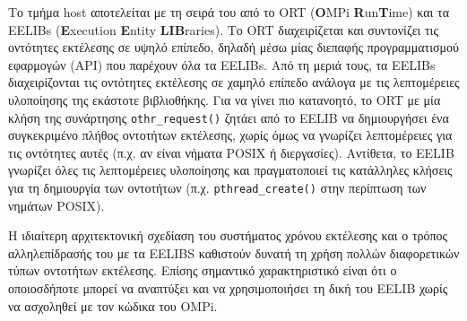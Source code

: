 Το τμήμα host αποτελείται με τη σειρά του από το ORT (\textbf{O}MPi \textbf{R}un\textbf{T}ime) και τα EELIBs (\textbf{E}xecution \textbf{E}ntity \textbf{LIB}raries). Το ORT διαχειρίζεται και συντονίζει τις οντότητες εκτέλεσης σε υψηλό επίπεδο, δηλαδή μέσω μίας διεπαφής προγραμματισμού εφαρμογών (API) που παρέχουν όλα τα EELIBs. Από τη μεριά τους, τα EELIBs διαχειρίζονται τις οντότητες εκτέλεσης σε χαμηλό επίπεδο ανάλογα με τις λεπτομέρειες υλοποίησης της εκάστοτε βιβλιοθήκης. Για να γίνει πιο κατανοητό, το ORT με μία κλήση της συνάρτησης \texttt{othr\_request()} ζητάει από το EELIB να δημιουργήσει ένα συγκεκριμένο πλήθος οντοτήτων εκτέλεσης, χωρίς όμως να γνωρίζει λεπτομέρειες για τις οντότητες αυτές (π.χ. αν είναι νήματα POSIX ή διεργασίες). Αντίθετα, το EELIB γνωρίζει όλες τις λεπτομέρειες υλοποίησης και πραγματοποιεί τις κατάλληλες κλήσεις για τη δημιουργία των οντοτήτων (π.χ. \texttt{pthread\_create()} στην περίπτωση των νημάτων POSIX).

Η ιδιαίτερη αρχιτεκτονική σχεδίαση του συστήματος χρόνου εκτέλεσης και ο τρόπος αλληλεπίδρασής του με τα EELIBS καθιστούν δυνατή τη χρήση πολλών διαφορετικών τύπων οντοτήτων εκτέλεσης. Επίσης σημαντικό χαρακτηριστικό είναι ότι ο οποιοσδήποτε μπορεί να αναπτύξει και να χρησιμοποιήσει τη δική του EELIB χωρίς να ασχοληθεί με τον κώδικα του OMPi.


